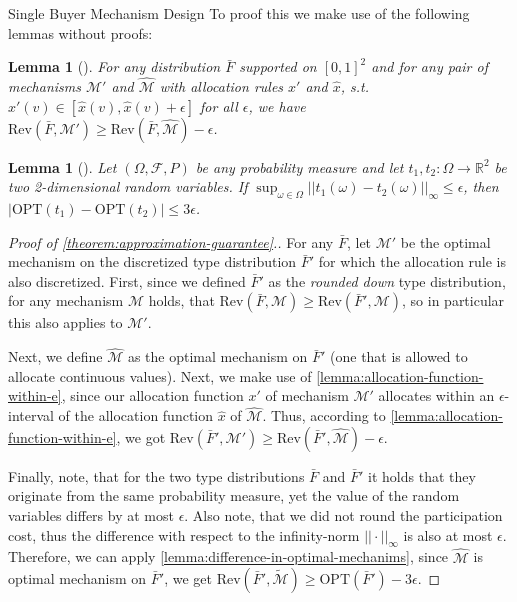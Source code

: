 \documentclass[11pt,a4paper]{article}
\newtheorem{lemma}[theorem]{Lemma}
\newcommand{\1}[1]{\mbox{\rm\bf 1}_{#1}}
\begin{document}
\begin{section}{Single Buyer Mechanism Design}
 To proof this we make use of the following lemmas without proofs:
 \begin{lemma}[\citet{primary}]
     \label{lemma:allocation-function-within-e}
     For any distribution $\bar{F}$ supported on $[0,1]^2$ and for any pair of mechanisms $\mathcal{M}'$ and $\widehat{\mathcal{M}}$
     with allocation rules $x'$ and $\hat{x}$, s.t. $x'(v) \in [\hat{x}(v), \hat{x}(v) + \epsilon]$ for all $\epsilon$, we have $\mathrm{Rev}(\bar{F}, \mathcal{M}') \geq \mathrm{Rev}(\bar{F}, \widehat{\mathcal{M}}) - \epsilon$.
 \end{lemma}
 \begin{lemma}[\citet{primary}]
     \label{lemma:difference-in-optimal-mechanims}
     Let $(\Omega, \mathcal{F}, P)$ be any probability measure and let $t_1, t_2: \Omega \rightarrow \mathbb{R}^2$ be two 2-dimensional random variables.
     If $\sup_{\omega \in \Omega} || t_1(\omega) - t_2(\omega) ||_\infty \leq \epsilon$, then $|\mathrm{OPT}(t_1) - \mathrm{OPT}(t_2)| \leq 3\epsilon$.
 \end{lemma}

 \begin{proof}[Proof of \autoref{theorem:approximation-guarantee}.]
     For any $\bar{F}$, let $\mathcal{M}'$ be the optimal mechanism on the discretized type distribution $\bar{F}'$ for which the allocation rule is also discretized.
     First, since we defined $\bar{F}'$ as the \textit{rounded down} type distribution, for any mechanism $\mathcal{M}$ holds, that $\mathrm{Rev}(\bar{F}, \mathcal{M}) \geq \mathrm{Rev}(\bar{F}', \mathcal{M})$, so in particular this also applies to $\mathcal{M}'$.

     Next, we define $\widehat{\mathcal{M}}$ as the optimal mechanism on $\bar{F}'$ (one that is allowed to allocate continuous values).
     Next, we make use of \autoref{lemma:allocation-function-within-e}, since our allocation function $x'$ of mechanism $\mathcal{M}'$
     allocates within an $\epsilon$-interval of the allocation function $\hat{x}$ of $\widehat{\mathcal{M}}$.
     Thus, according to \autoref{lemma:allocation-function-within-e}, we got $\mathrm{Rev}(\bar{F}', \mathcal{M}') \geq \mathrm{Rev}(\bar{F}', \widehat{\mathcal{M}}) - \epsilon$.

     Finally, note, that for the two type distributions $\bar{F}$ and $\bar{F}'$ it holds that they originate from the same probability measure, yet the value of the random variables differs by at most $\epsilon$.
     Also note, that we did not round the participation cost, thus the difference with respect to the infinity-norm $|| \cdot ||_{\infty}$ is also at most $\epsilon$.
     Therefore, we can apply \autoref{lemma:difference-in-optimal-mechanims}, since $\widehat{\mathcal{M}}$ is optimal mechanism on $\bar{F}'$,
     we get $\mathrm{Rev}(\bar{F}', \widetilde{\mathcal{M}}) \geq \mathrm{OPT}(\bar{F}') - 3\epsilon$.


\end{proof}
\end{section}
\end{document}
